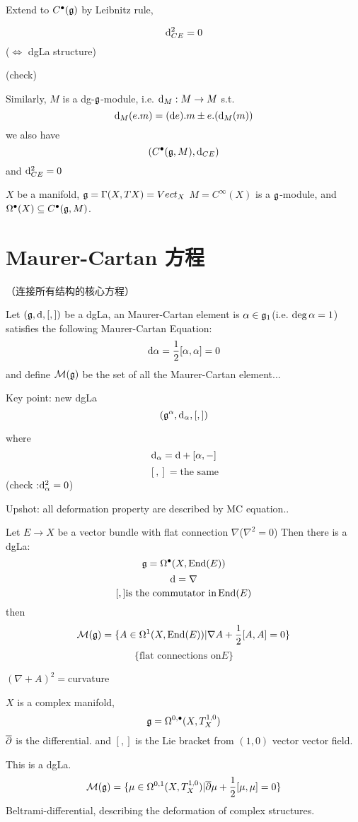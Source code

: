 Extend to $C^{\bullet}(\mathfrak{g})$ by Leibnitz rule,
\begin{prop}
$$\mathrm{d}_{CE}^2=0$$
($\iff$ dgLa structure)
\end{prop}
(check)

Similarly, $M$ is a dg-$\mathfrak{g}$-module, i.e.
$\mathrm{d}_M:M\to M$ s.t.
$$\mathrm{d}_M(e.m)=(\mathrm{d} e).m\pm e.(\mathrm{d}_M (m))$$
we also have
$$(C^{\bullet}(\mathfrak{g},M),\mathrm{d}_{CE})$$
and $\mathrm{d}_{CE}^2=0$

\begin{example}
$X$ be a manifold, $\mathfrak{g}=\Gamma(X,TX)=Vect_X$
$M=C^\infty(X)$ is a $\mathfrak{g}$-module, and
$\Omega^{\bullet}(X)\subseteq C^{\bullet}(\mathfrak{g},M)$.
\end{example}

\section{Maurer-Cartan 方程}
（连接所有结构的核心方程）

Let $(\mathfrak{g},\mathrm{d},[,])$ be a dgLa, an
Maurer-Cartan element is  $\alpha\in\mathfrak{g}_1$(i.e. $\deg\alpha=1$)
satisfies the following Maurer-Cartan Equation:
$$\mathrm{d}\alpha=\frac{1}{2}[\alpha,\alpha]=0$$
and define $\mathcal{M}(\mathfrak{g})$ be the set of all the Maurer-Cartan element...

Key point: new dgLa
$$(\mathfrak{g}^\alpha,\mathrm{d}_\alpha,[,])$$

where
$$\mathrm{d}_{\alpha}=\mathrm{d}+[\alpha,-]$$
$$[,]=\text{the same}$$
(check :$\mathrm{d}_\alpha^2=0$)

Upshot: all deformation property are described by MC equation..

\begin{example}
Let $E\to X$ be a vector bundle with flat connection $\nabla$($\nabla^2=0$)
Then there is a dgLa:
$$\mathfrak{g}=\Omega^{\bullet}(X,\operatorname{End}(E))$$
$$\mathrm{d}=\nabla$$
$$[,]\text{is the commutator in}\operatorname{End}(E)$$
then
$$\mathcal{M}(\mathfrak{g})=\{A\in\Omega^1(X,\operatorname{End}(E))|\nabla A+\frac{1}{2}[A,A]=0\}$$
$$\{\text{flat connections on} E\}$$

$(\nabla+A)^2=$curvature
\end{example}

\begin{example}
$X$ is a complex manifold,
$$\mathfrak{g}=\Omega^{0,\bullet}(X,T_X^{1,0})$$
$\overline{\partial}$ is the differential. and
$[,]$ is the Lie bracket from $(1,0)$ vector vector field.

This is a dgLa.
$$\mathcal{M}(\mathfrak{g})=
\{\mu\in\Omega^{0,1}(X,T_X^{1,0})|
\overline{\partial}\mu+\frac{1}{2}[\mu,\mu]=0
\}$$
Beltrami-differential, describing the deformation of complex structures.
\end{example}

